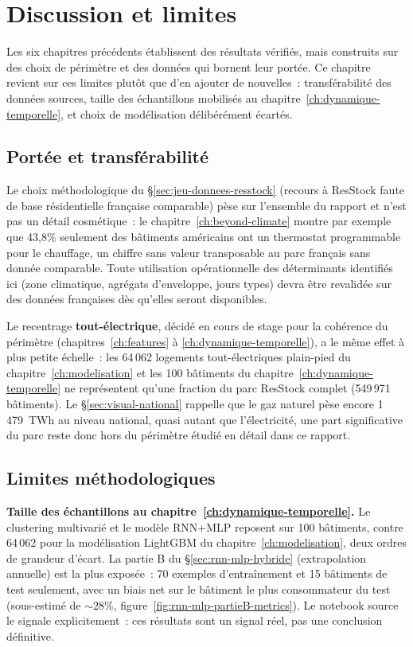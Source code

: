 \chapter{Discussion et limites}
\label{ch:discussion}

Les six chapitres précédents établissent des résultats vérifiés, mais construits sur des choix de
périmètre et des données qui bornent leur portée. Ce chapitre revient sur ces limites plutôt que
d'en ajouter de nouvelles~: transférabilité des données sources, taille des échantillons mobilisés
au chapitre~\ref{ch:dynamique-temporelle}, et choix de modélisation délibérément écartés.

\section{Portée et transférabilité}
\label{sec:portee-transferabilite}
Le choix méthodologique du \S\ref{sec:jeu-donnees-resstock} (recours à ResStock faute de base
résidentielle française comparable) pèse sur l'ensemble du rapport et n'est pas un détail
cosmétique~: le chapitre~\ref{ch:beyond-climate} montre par exemple que 43,8\% seulement des
bâtiments américains ont un thermostat programmable pour le chauffage, un chiffre sans valeur
transposable au parc français sans donnée comparable. Toute utilisation opérationnelle des
déterminants identifiés ici (zone climatique, agrégats d'enveloppe, jours types) devra être
revalidée sur des données françaises dès qu'elles seront disponibles.

Le recentrage \textbf{tout-électrique}, décidé en cours de stage pour la cohérence du périmètre
(chapitres~\ref{ch:features} à \ref{ch:dynamique-temporelle}), a le même effet à plus petite
échelle~: les 64\,062 logements tout-électriques plain-pied du chapitre~\ref{ch:modelisation} et
les 100 bâtiments du chapitre~\ref{ch:dynamique-temporelle} ne représentent qu'une fraction du
parc ResStock complet (549\,971 bâtiments). Le \S\ref{sec:visual-national} rappelle que le gaz
naturel pèse encore 1\,479~TWh au niveau national, quasi autant que l'électricité, une part
significative du parc reste donc hors du périmètre étudié en détail dans ce rapport.

\section{Limites méthodologiques}
\label{sec:limites-methodo}
\textbf{Taille des échantillons au chapitre~\ref{ch:dynamique-temporelle}.} Le clustering
multivarié et le modèle RNN+MLP reposent sur 100 bâtiments, contre 64\,062 pour la modélisation
LightGBM du chapitre~\ref{ch:modelisation}, deux ordres de grandeur d'écart. La partie B du
\S\ref{sec:rnn-mlp-hybride} (extrapolation annuelle) est la plus exposée~: 70 exemples
d'entraînement et 15 bâtiments de test seulement, avec un biais net sur le bâtiment le plus
consommateur du test (sous-estimé de $\sim$28\%, figure~\ref{fig:rnn-mlp-partieB-metrics}). Le
notebook source le signale explicitement~: ces résultats sont un signal réel, pas une conclusion
définitive.

